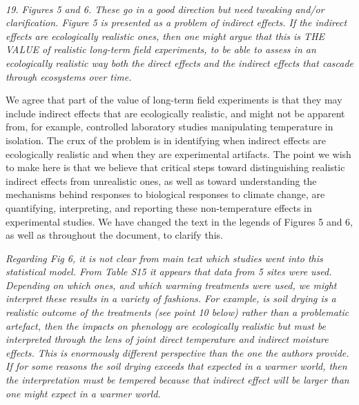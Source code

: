 \documentclass[11pt,a4paper]{letter}
\begin{document}
\begin{letter}{}
\\
\par \emph{19. Figures 5 and 6. These go in a good direction but need tweaking and/or clarification. Figure 5 is presented as a
problem of indirect effects. If the indirect effects are ecologically realistic ones, then one might
argue that this is THE VALUE of realistic long-term field experiments, to be able to assess in an
ecologically realistic way both the direct effects and the indirect effects that cascade through
ecosystems over time.}

We agree that part of the value of long-term field experiments is that they may include indirect effects that are ecologically realistic, and might not be apparent from, for example, controlled laboratory studies manipulating temperature in isolation. The crux of the problem is in identifying when indirect effects are ecologically realistic and when they are experimental artifacts. The point we wish to make here is that we believe that critical steps toward distinguishing realistic indirect effects from unrealistic ones, as well as toward understanding the mechanisms behind responses to biological responses to climate change, are quantifying, interpreting, and reporting these non-temperature effects in experimental studies. We have changed the text in the legends of Figures 5 and 6, as well as throughout the document, to clarify this. 
\\
\par \emph{Regarding Fig 6, it is not clear from main text which studies went into this statistical model. From Table S15 it appears that data from 5 sites were used. Depending on which ones, and which warming treatments were used, we might interpret these results in a variety of fashions. For example, is soil drying is a realistic outcome of the treatments (see point 10 below) rather than a problematic artefact, then the impacts on phenology are ecologically realistic but must be interpreted through the lens of joint direct temperature and indirect moisture effects. This is enormously different perspective than the one the authors provide. If for some reasons the soil drying exceeds that expected in a warmer world, then the interpretation must be tempered because that indirect effect will be larger than one might expect in a warmer world.}


\end{letter}
\end{document}
